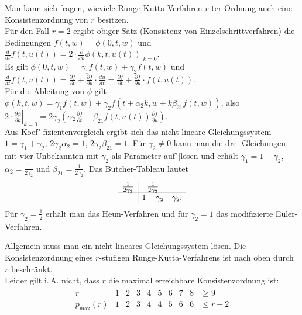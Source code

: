 \linie
\pagebreak

\begin{Bem}
    Man kann sich fragen, wieviele Runge-Kutta-Verfahren $r$-ter Ordnung
    auch eine Konsistenzordnung von $r$ besitzen.\\
    Für den Fall $r = 2$ ergibt obiger Satz
    (Konsistenz von Einzelschrittverfahren)
    die Bedingungen $f(t, w) = \phi(0, t, w)$ und
    $\frac{d}{dt} f(t, u(t)) =
    2 \cdot \frac{\partial}{\partial k} \phi(k, t, u(t))|_{k=0}$.\\
    Es gilt $\phi(0, t, w) = \gamma_1 f(t, w) + \gamma_2 f(t, w)$
    und $\frac{d}{dt} f(t, u(t)) = \frac{\partial f}{\partial t} +
    \frac{\partial f}{\partial u} \cdot \frac{du}{dt} =
    \frac{\partial f}{\partial t} +
    \frac{\partial f}{\partial u} \cdot f(t, u(t))$.\\
    Für die Ableitung von $\phi$ gilt
    $\phi(k, t, w) = \gamma_1 f(t, w) +
    \gamma_2 f(t + \alpha_2 k, w + k \beta_{21} f(t, w))$, also\\
    $2 \cdot \left.\frac{\partial \phi}{\partial k}\right|_{k=0} =
    2 \gamma_2 (\alpha_2 \frac{\partial f}{\partial t} +
    \beta_{21} f(t, u(t)) \frac{\partial f}{\partial u})$.\\
    Aus Koef"|fizientenvergleich ergibt sich das nicht-lineare Gleichungssystem
    $1 = \gamma_1 + \gamma_2$, $2 \gamma_2 \alpha_2 = 1$,
    $2 \gamma_2 \beta_{21} = 1$.
    Für $\gamma_2 \not= 0$ kann man die drei Gleichungen mit vier Unbekannten
    mit $\gamma_2$ als Parameter auf"|lösen und erhält
    $\gamma_1 = 1 - \gamma_2$, $\alpha_2 = \frac{1}{2 \gamma_2}$ und
    $\beta_{21} = \frac{1}{2 \gamma_2}$.
    Das Butcher-Tableau lautet
    \begin{align*}
        \begin{array}{c|cc}
            \frac{1}{2 \gamma_2} & \frac{1}{2 \gamma_2}\\\hline
            & 1 - \gamma_2 & \gamma_2.
        \end{array}
    \end{align*}
    Für $\gamma_2 = \frac{1}{2}$ erhält man das Heun-Verfahren und für
    $\gamma_2 = 1$ das modifizierte Euler-Verfahren.
\end{Bem}

\begin{Bem}
    Allgemein muss man ein nicht-lineares Gleichungssystem lösen.
    Die Konsistenzordnung  eines $r$-stufigen Runge-Kutta-Verfahrens ist nach
    oben durch $r$ beschränkt.\\
    Leider gilt i.\,A. nicht, dass $r$ die maximal erreichbare
    Konsistenzordnung ist:
    \begin{align*}
        \begin{array}{c|ccccccccc}
            r & 1 & 2 & 3 & 4 & 5 & 6 & 7 & 8 & \ge 9\\\hline
            p_{\max}(r) & 1 & 2 & 3 & 4 & 4 & 5 & 6 & 6 & \le r - 2
        \end{array}
    \end{align*}
\end{Bem}

